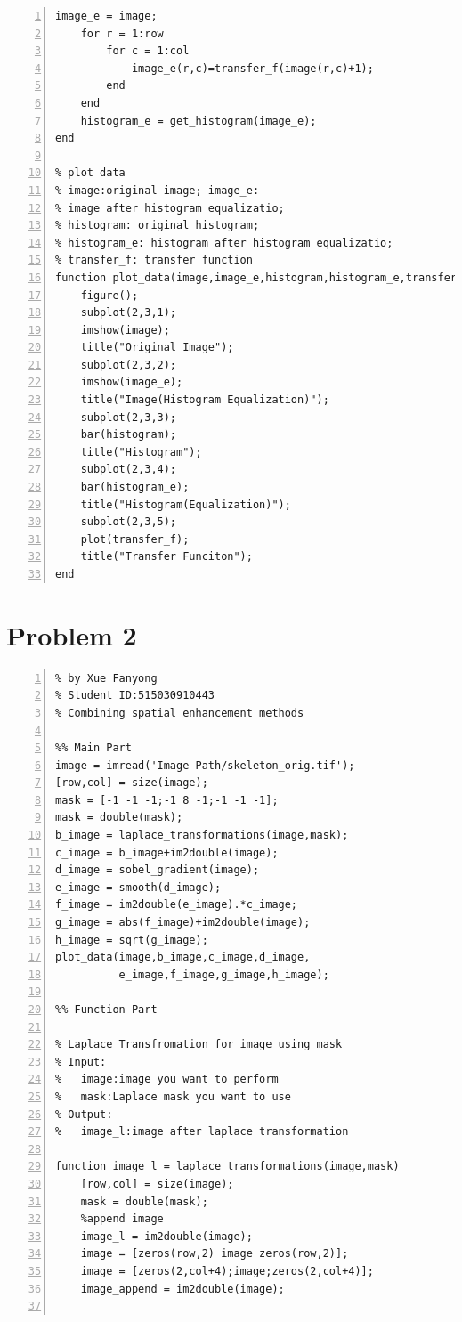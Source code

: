 \documentclass[11pt,oneside]{book}
\begin{document}
\begin{appendices}
\begin{lstlisting}[numbers=left, numberstyle=\tiny,keywordstyle=\color{blue!70},commentstyle=\color{red!50!green!50!blue!50},frame=shadowbox, rulesepcolor=\color{red!20!green!20!blue!20}]
    image_e = image;
    for r = 1:row
        for c = 1:col
            image_e(r,c)=transfer_f(image(r,c)+1);
        end
    end
    histogram_e = get_histogram(image_e);
end

% plot data
% image:original image; image_e: 
% image after histogram equalizatio; 
% histogram: original histogram; 
% histogram_e: histogram after histogram equalizatio;
% transfer_f: transfer function
function plot_data(image,image_e,histogram,histogram_e,transfer_f)
    figure();
    subplot(2,3,1);
    imshow(image);
    title("Original Image");
    subplot(2,3,2);
    imshow(image_e);
    title("Image(Histogram Equalization)");
    subplot(2,3,3);
    bar(histogram);
    title("Histogram");
    subplot(2,3,4);
    bar(histogram_e);
    title("Histogram(Equalization)");
    subplot(2,3,5);
    plot(transfer_f);
    title("Transfer Funciton");
end

\end{lstlisting}


\section{Problem 2}

\begin{lstlisting}[numbers=left, numberstyle=\tiny,keywordstyle=\color{blue!70},commentstyle=\color{red!50!green!50!blue!50},frame=shadowbox, rulesepcolor=\color{red!20!green!20!blue!20}] 
% Problem 2
% by Xue Fanyong
% Student ID:515030910443
% Combining spatial enhancement methods

%% Main Part
image = imread('Image Path/skeleton_orig.tif');
[row,col] = size(image);
mask = [-1 -1 -1;-1 8 -1;-1 -1 -1];
mask = double(mask);
b_image = laplace_transformations(image,mask);
c_image = b_image+im2double(image);
d_image = sobel_gradient(image);
e_image = smooth(d_image);
f_image = im2double(e_image).*c_image;
g_image = abs(f_image)+im2double(image);
h_image = sqrt(g_image);
plot_data(image,b_image,c_image,d_image,
          e_image,f_image,g_image,h_image);

%% Function Part

% Laplace Transfromation for image using mask
% Input:
%   image:image you want to perform
%   mask:Laplace mask you want to use
% Output:
%   image_l:image after laplace transformation

function image_l = laplace_transformations(image,mask)
    [row,col] = size(image);
    mask = double(mask);
    %append image
    image_l = im2double(image);
    image = [zeros(row,2) image zeros(row,2)];
    image = [zeros(2,col+4);image;zeros(2,col+4)];
    image_append = im2double(image);
    

\end{lstlisting}
\end{appendices}
\end{document}
